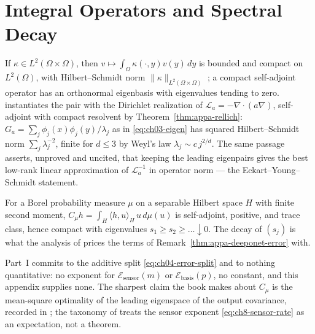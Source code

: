 \section{Integral Operators and Spectral Decay}

\begin{theorem}\label{thm:appa-hilbert-schmidt}
If $\kappa \in L^2(\Omega \times \Omega)$, then
$v \mapsto \int_\Omega \kappa(\cdot,y) v(y)\,dy$ is bounded and compact on $L^2(\Omega)$, with
Hilbert--Schmidt norm $\|\kappa\|_{L^2(\Omega\times\Omega)}$ \cite{brezis2011functional}; a
compact self-adjoint operator
has an orthonormal eigenbasis with eigenvalues tending to zero.
 instantiates the pair with the
Dirichlet realization of $\mathcal{L}_a = -\nabla \cdot (a\nabla)$, self-adjoint with compact
resolvent by Theorem~\ref{thm:appa-rellich}: $G_a = \sum_j \phi_j(x)\phi_j(y)/\lambda_j$ as in
\eqref{eq:ch03-eigen} has squared Hilbert--Schmidt norm $\sum_j \lambda_j^{-2}$, finite for
$d \le 3$ by Weyl's law $\lambda_j \sim c\,j^{2/d}$. The same passage asserts, unproved and
uncited, that keeping the leading eigenpairs gives the best low-rank linear approximation of
$\mathcal{L}_a^{-1}$ in operator norm --- the Eckart--Young--Schmidt statement.
\end{theorem}

\begin{definition}\label{def:appa-covariance}
For a Borel probability measure $\mu$ on a separable Hilbert space $H$ with finite second
moment, $C_\mu h = \int_H \langle h,u \rangle_H\, u\, d\mu(u)$ is self-adjoint, positive, and
trace class, hence compact with eigenvalues $s_1 \ge s_2 \ge \dots \downarrow 0$. The decay of
$(s_j)$ is what the analysis of \cite{lanthaler2022error} prices the terms of
Remark~\ref{thm:appa-deeponet-error} with.
\end{definition}

\begin{remark}\label{rem:appa-silent}
Part~I commits to the additive split \eqref{eq:ch04-error-split} and to nothing quantitative:
no exponent for $\mathcal{E}_{\text{sensor}}(m)$ or $\mathcal{E}_{\text{basis}}(p)$, no
constant, and this appendix supplies none. The sharpest claim the book makes about $C_\mu$ is
the mean-square optimality of the leading eigenspace of the output covariance, recorded in
; the taxonomy of
 treats the sensor exponent
\eqref{eq:ch8-sensor-rate} as an expectation, not a theorem.
\end{remark}

